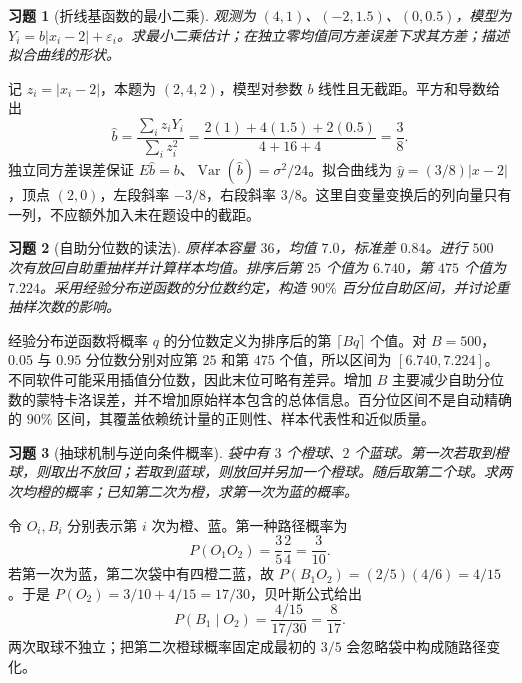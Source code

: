 \documentclass[12pt,fontset=fandol]{ctexart}
\newtheorem{exercise}{习题}[section]
\begin{document}
\begin{exercise}[折线基函数的最小二乘]\label{q:M-F-12}
观测为 $(4,1)$、$(-2,1.5)$、$(0,0.5)$，模型为 $Y_i=b|x_i-2|+\varepsilon_i$。求最小二乘估计；在独立零均值同方差误差下求其方差；描述拟合曲线的形状。\par{}
\end{exercise}

\begin{solve}\label{a:M-F-12}记 $z_i=|x_i-2|$，本题为 $(2,4,2)$，模型对参数 $b$ 线性且无截距。平方和导数给出\[\widehat b=\frac{\sum_i z_iY_i}{\sum_i z_i^2}=\frac{2(1)+4(1.5)+2(0.5)}{4+16+4}=\frac38.\]独立同方差误差保证 $E\widehat b=b$、$\operatorname{Var}(\widehat b)=\sigma^2/24$。拟合曲线为 $\widehat y=(3/8)|x-2|$，顶点 $(2,0)$，左段斜率 $-3/8$，右段斜率 $3/8$。这里自变量变换后的列向量只有一列，不应额外加入未在题设中的截距。\end{solve}

\begin{exercise}[自助分位数的读法]\label{q:M-F-13}
原样本容量 $36$，均值 $7.0$，标准差 $0.84$。进行 $500$ 次有放回自助重抽样并计算样本均值。排序后第 $25$ 个值为 $6.740$，第 $475$ 个值为 $7.224$。采用经验分布逆函数的分位数约定，构造 $90\%$ 百分位自助区间，并讨论重抽样次数的影响。\par{}
\end{exercise}

\begin{solve}\label{a:M-F-13}经验分布逆函数将概率 $q$ 的分位数定义为排序后的第 $\lceil Bq\rceil$ 个值。对 $B=500$，$0.05$ 与 $0.95$ 分位数分别对应第 $25$ 和第 $475$ 个值，所以区间为 $[6.740,7.224]$。不同软件可能采用插值分位数，因此末位可略有差异。增加 $B$ 主要减少自助分位数的蒙特卡洛误差，并不增加原始样本包含的总体信息。百分位区间不是自动精确的 $90\%$ 区间，其覆盖依赖统计量的正则性、样本代表性和近似质量。\end{solve}

\begin{exercise}[抽球机制与逆向条件概率]\label{q:M-PF-18}
袋中有 $3$ 个橙球、$2$ 个蓝球。第一次若取到橙球，则取出不放回；若取到蓝球，则放回并另加一个橙球。随后取第二个球。求两次均橙的概率；已知第二次为橙，求第一次为蓝的概率。\par{}
\end{exercise}

\begin{solve}\label{a:M-PF-18}令 $O_i,B_i$ 分别表示第 $i$ 次为橙、蓝。第一种路径概率为\[P(O_1O_2)=\frac35\frac24=\frac3{10}.\]若第一次为蓝，第二次袋中有四橙二蓝，故 $P(B_1O_2)=(2/5)(4/6)=4/15$。于是 $P(O_2)=3/10+4/15=17/30$，贝叶斯公式给出\[P(B_1\mid O_2)=\frac{4/15}{17/30}=\frac8{17}.\]两次取球不独立；把第二次橙球概率固定成最初的 $3/5$ 会忽略袋中构成随路径变化。\end{solve}
\end{document}
